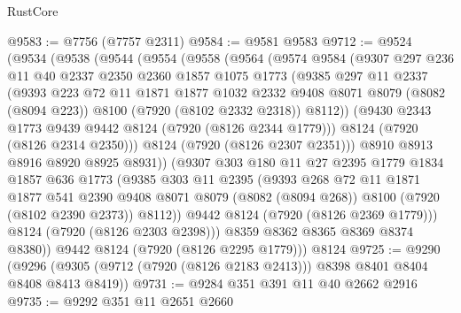 \begin{lexlean}{RustCore}
\begin{coremodule}
@9583 := @7756 (@7757 @2311)
@9584 := @9581 @9583
@9712 := @9524
    (@9534
      (@9538
        (@9544
          (@9554
            (@9558
              (@9564
                (@9574
                  @9584
                  (@9307
                    @297
                    @236
                    @11
                    @40
                    @2337
                    @2350
                    @2360
                    @1857
                    @1075
                    @1773
                    (@9385
                      @297
                      @11
                      @2337
                      (@9393
                        @223
                        @72
                        @11
                        @1871
                        @1877
                        @1032
                        @2332
                        @9408
                        @8071
                        @8079
                        (@8082 (@8094 @223))
                        @8100
                        (@7920 (@8102 @2332 @2318))
                        @8112))
                    (@9430 @2343 @1773 @9439 @9442 @8124 (@7920 (@8126 @2344 @1779)))
                    @8124
                    (@7920 (@8126 @2314 @2350)))
                  @8124
                  (@7920 (@8126 @2307 @2351)))
                @8910
                @8913
                @8916
                @8920
                @8925
                @8931))
            (@9307
              @303
              @180
              @11
              @27
              @2395
              @1779
              @1834
              @1857
              @636
              @1773
              (@9385
                @303
                @11
                @2395
                (@9393
                  @268
                  @72
                  @11
                  @1871
                  @1877
                  @541
                  @2390
                  @9408
                  @8071
                  @8079
                  (@8082 (@8094 @268))
                  @8100
                  (@7920 (@8102 @2390 @2373))
                  @8112))
              @9442
              @8124
              (@7920 (@8126 @2369 @1779)))
            @8124
            (@7920 (@8126 @2303 @2398)))
          @8359
          @8362
          @8365
          @8369
          @8374
          @8380))
      @9442
      @8124
      (@7920 (@8126 @2295 @1779)))
    @8124
@9725 := @9290
    (@9296 (@9305 (@9712 (@7920 (@8126 @2183 @2413))) @8398 @8401 @8404 @8408 @8413 @8419))
@9731 := @9284 @351 @391 @11 @40 @2662 @2916
@9735 := @9292 @351 @11 @2651 @2660

\end{coremodule}
\end{lexlean}
